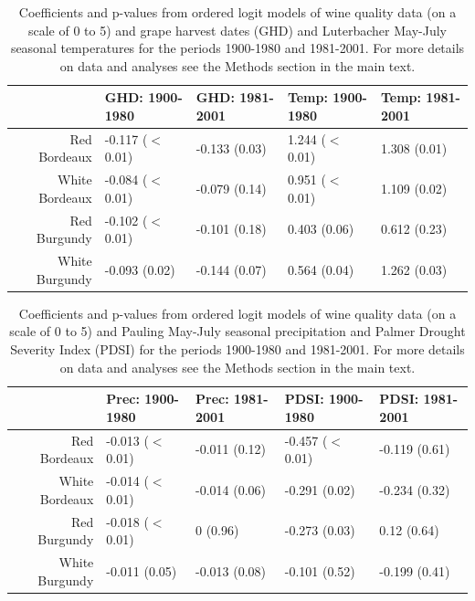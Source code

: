 \documentclass[12pt]{article}
\begin{document}
\begin{table}
\centering
\caption{Coefficients and p-values from ordered logit models of wine quality data (on a scale of 0 to 5) and grape harvest dates (GHD) and Luterbacher May-July seasonal temperatures for the periods 1900-1980 and 1981-2001. For more details on data and analyses see the Methods section in the main text.} 
\begin{tabular}{||r||l|l||l|l||}
  \hline
 & GHD: 1900-1980 & GHD: 1981-2001 & Temp: 1900-1980 & Temp: 1981-2001 \\ 
  \hline
Red Bordeaux & -0.117 ($<$0.01) & -0.133 (0.03) & 1.244 ($<$0.01) & 1.308 (0.01) \\ 
  White Bordeaux & -0.084 ($<$0.01) & -0.079 (0.14) & 0.951 ($<$0.01) & 1.109 (0.02) \\ 
  Red Burgundy & -0.102 ($<$0.01) & -0.101 (0.18) & 0.403 (0.06) & 0.612 (0.23) \\ 
  White Burgundy & -0.093 (0.02) & -0.144 (0.07) & 0.564 (0.04) & 1.262 (0.03) \\ 
   \hline
\end{tabular}
\end{table}%

\begin{table}
\centering
\caption{Coefficients and p-values from  ordered logit models of wine quality data (on a scale of 0 to 5) and Pauling May-July seasonal precipitation and Palmer Drought Severity Index (PDSI) for the periods 1900-1980 and 1981-2001. For more details on data and analyses see the Methods section in the main text.} 
\begin{tabular}{||r||l|l||l|l||}
  \hline
 & Prec: 1900-1980 & Prec: 1981-2001 & PDSI: 1900-1980 & PDSI: 1981-2001 \\ 
  \hline
Red Bordeaux & -0.013 ($<$0.01) & -0.011 (0.12) & -0.457 ($<$0.01) & -0.119 (0.61) \\ 
  White Bordeaux & -0.014 ($<$0.01) & -0.014 (0.06) & -0.291 (0.02) & -0.234 (0.32) \\ 
  Red Burgundy & -0.018 ($<$0.01) & 0 (0.96) & -0.273 (0.03) & 0.12 (0.64) \\ 
  White Burgundy & -0.011 (0.05) & -0.013 (0.08) & -0.101 (0.52) & -0.199 (0.41) \\ 
   \hline
\end{tabular}
\end{table}
\end{document}
